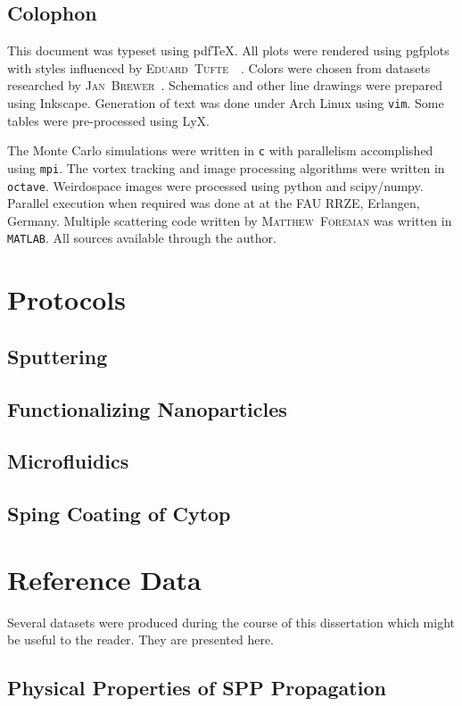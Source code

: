 \documentclass[a4paper,titlepage,onecolumn]{report}
\newcommand{\name}[1]{\textsc{#1}}
\begin{document}
\section{Colophon}
This document was typeset using pdf\TeX. All
plots were rendered using pgfplots~\cite{feuersangerpgfplots} with styles influenced by
\name{Eduard~Tufte}~\cite{tufte1983visual}~\cite{tufte1991envisioning}. Colors were chosen
from datasets researched by \name{Jan~Brewer}~\cite{harrower2003colorbrewer}.
Schematics and other line drawings were prepared using Inkscape. Generation
of text was done under Arch Linux using \texttt{vim}.  Some tables were
pre-processed using LyX.

The Monte Carlo simulations were written in \texttt{c} with parallelism
accomplished using \texttt{mpi}. The vortex tracking and image processing
algorithms were written in \texttt{octave}.  Weirdospace images were
processed using python and scipy/numpy.  Parallel execution when required
was done at at the FAU RRZE, Erlangen, Germany.  Multiple scattering code
written by \name{Matthew~Foreman} was written in \texttt{MATLAB}.  All sources
available through the author.

\chapter{Protocols}
\section{Sputtering}
\section{Functionalizing Nanoparticles}
\section{Microfluidics}
\section{Sping Coating of Cytop}

\chapter{Reference Data}
Several datasets were produced during the course of this dissertation which
might be useful to the reader.  They are presented here.
\section{Physical Properties of SPP Propagation}
\label{ref:physicalproperties}
\end{document}
